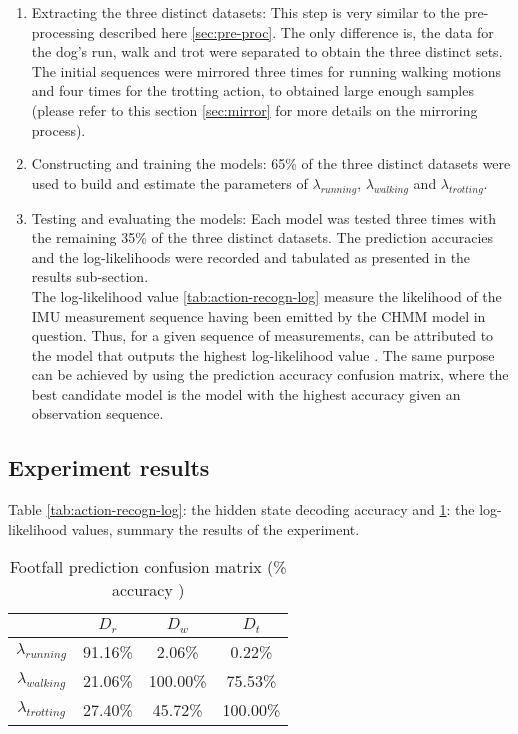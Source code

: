 \begin{enumerate}
	\item Extracting the three distinct datasets: This step is very similar to the pre-processing described here \ref{sec:pre-proc}. The only difference is, the data for the dog's run, walk and trot were separated to obtain the three distinct sets. The initial sequences were mirrored three times for running walking motions and four times for the trotting action, to obtained large enough samples (please refer to this section \ref{sec:mirror} for more details on the mirroring process).
	
	\item Constructing and training the models: 65\% of the three distinct datasets were used to build and estimate the parameters of \(\lambda_{running}\), \(\lambda_{walking}\) and \(\lambda_{trotting}\).
	
	\item Testing and evaluating the models: Each model was tested three times with the remaining 35\% of the three distinct datasets. The prediction accuracies and the log-likelihoods were recorded and tabulated as presented in the results sub-section.\\
	The log-likelihood value \ref{tab:action-recogn-log} measure the likelihood of the IMU measurement sequence having been emitted by the CHMM model in question.
	Thus, for a given sequence of measurements, can be attributed to the model that outputs the highest log-likelihood value \cite{cont2013}.
	The same purpose can be achieved by using the prediction accuracy confusion matrix, where the best candidate model is the model with the highest accuracy given an observation sequence.
\end{enumerate} 

\subsection{Experiment results}

Table \ref{tab:action-recogn-log}: the hidden state decoding accuracy and \ref{tab:action-recogn-acc}: the log-likelihood values, summary the results of the experiment.\\

\begin{table}[h!] 
	\centering
	\begin{tabular}{ c|c|c|c} 
		\hline
		\hline	
		& \(D_r\) &  \(D_w\) & \(D_t\)\\ 
		\hline
		\hline
		\(\lambda_{running}\) & 91.16\% & 2.06\% & 0.22\% \\ 
		\hline
		\(\lambda_{walking}\) & 21.06\% & 100.00\% & 75.53\% \\ 
		\hline
		\(\lambda_{trotting}\) & 27.40\% & 45.72\% & 100.00\%\\	
		\hline
	\end{tabular}
	\caption{Footfall prediction confusion matrix (\% accuracy )}
	\label{tab:action-recogn-acc}
\end{table}

